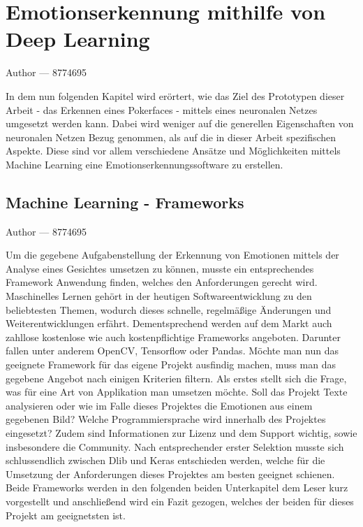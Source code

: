 \documentclass[12pt, a4paper]{report}
\makeatletter
\newcommand{\sectionauthor}[1]{%
  {\parindent0pt\vspace*{-5pt}%
  \large{Author --- }
  \linespread{1.1}\large\scshape#1%
  \par\nobreak\vspace*{35pt} }
  \@afterheading%
}
\makeatother
\begin{document}
\section{Emotionserkennung mithilfe von Deep Learning}
\sectionauthor{8774695}
In dem nun folgenden Kapitel wird erörtert, wie das Ziel des Prototypen dieser Arbeit - das Erkennen eines Pokerfaces - mittels eines neuronalen Netzes umgesetzt werden kann. Dabei wird weniger auf die generellen Eigenschaften von neuronalen Netzen Bezug genommen, als auf die in dieser Arbeit spezifischen Aspekte. Diese sind vor allem verschiedene Ansätze und Möglichkeiten mittels Machine Learning eine Emotionserkennungssoftware zu erstellen.

\subsection{Machine Learning - Frameworks}
\sectionauthor{8774695}
Um die gegebene Aufgabenstellung der Erkennung von Emotionen mittels der Analyse eines Gesichtes umsetzen zu können, musste ein entsprechendes Framework Anwendung finden, welches den Anforderungen gerecht wird. Maschinelles Lernen gehört in der heutigen Softwareentwicklung zu den beliebtesten Themen, wodurch dieses schnelle, regelmäßige Änderungen und Weiterentwicklungen erfährt. Dementsprechend werden auf dem Markt auch zahllose kostenlose wie auch kostenpflichtige Frameworks angeboten. Darunter fallen unter anderem
 OpenCV, Tensorflow oder Pandas. Möchte man nun das geeignete Framework für das eigene Projekt ausfindig machen, muss man das gegebene Angebot nach einigen Kriterien filtern. Als erstes stellt sich die Frage, was für eine Art von Applikation man umsetzen möchte. Soll das Projekt Texte analysieren oder wie im Falle dieses Projektes die Emotionen aus einem gegebenen Bild? Welche Programmiersprache wird innerhalb des Projektes eingesetzt? Zudem sind Informationen zur Lizenz und dem Support wichtig, sowie insbesondere die Community.\newline
Nach entsprechender erster Selektion musste sich schlussendlich zwischen Dlib und Keras entschieden werden, welche für die Umsetzung der Anforderungen dieses Projektes am besten geeignet schienen. Beide Frameworks werden in den folgenden beiden Unterkapitel dem Leser kurz vorgestellt und anschließend wird ein Fazit gezogen, welches der beiden für dieses Projekt am geeignetsten ist.
\end{document}
